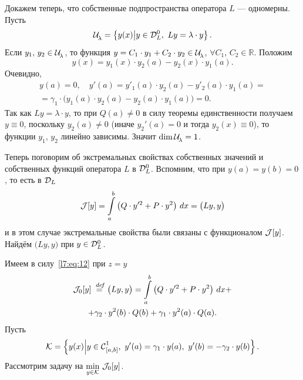 Докажем теперь, что собственные подпространства оператора $L$ --- одномерны. Пусть
\begin{equation*}
	\Ul=\left\{y(x)\middle|y\in\mc{D}_L^0,\ Ly=\lambda\cdot y\right\}.
\end{equation*}    
Если $y_1,\,y_2\in\mathcal{U}\!{\mathstrut}_{\lambda}$, то функция $y=C_1\cdot y_1+C_2\cdot y_2\in\mathcal{U}\!{\mathstrut}_{\lambda}$, $\forall C_1,\,C_2\in\mathbb{R}$. Положим
\begin{equation*}
	 y(x)=y_1(x)\cdot y_2(a)-y_2(x)\cdot y_1(a).
\end{equation*}
Очевидно,
\begin{multline*}
	y(a)=0,\quad y'(a)=y'_1(a)\cdot y_2(a)-y'_2(a)\cdot y_1(a)=\\=\gamma_1\cdot\big(y_1(a)\cdot y_2(a)-y_2(a)\cdot y_1(a)\big)=0.
\end{multline*} 
Так как $Ly=\lambda\cdot y$, то при $Q(a)\neq0$ в силу теоремы единственности получаем $y\equiv0$, поскольку $y_2(a)\neq0$ (иначе $y_2'(a)=0$ и тогда $y_2(x)\equiv0$), то функции $y_1,\,y_2$ линейно зависимы. Значит $\dim\mathcal{U}\!{\mathstrut}_{\lambda}=1$.

Теперь поговорим об экстремальных свойствах собственных значений и собственных функций оператора $L$ в $\mathcal{D}_L^0$. Вспомним, что при $y(a)=y(b)=0$, то есть в $\mathcal{D}_L$ 
\begin{equation*}
	\mathcal{J}[y]=\int\limits_a^b\left(Q\cdot y^{\prime2}+P\cdot y^2\right)\,dx=\big(Ly,y\big)
\end{equation*} 
и в этом случае экстремальные свойства были связаны с функционалом $\mathcal{J}[y]$. Найдём $\big(Ly,y\big)$ при $y\in\mathcal{D}_L^0$.

Имеем в силу~\eqref{l7:eq:12} при $z=y$
\begin{multline}
	\label{l7:eq:13}
	\mathcal{J}_0[y]\stackrel{\hspace{0.09 cm}de\!f}{=}\big(Ly,y\big)=\int\limits_a^b\left(Q\cdot y^{\prime2}+P\cdot y^2\right)\,dx+\\+\gamma_2\cdot y^2(b)\cdot Q(b)+\gamma_1\cdot y^2(a)\cdot Q(a).
\end{multline} 
Пусть
\begin{equation*}
	\K=\left\{y(x)\middle|y\in\Cfn[{[a,b]}]{1},\ y'(a)=\gamma_1\cdot y(a),\ y'(b)=-\gamma_2\cdot y(b) \right\}.
\end{equation*}
Рассмотрим задачу на $\displaystyle\min\limits_{y\in\mathcal{K}}\,\mathcal{J}_0[y]$. 

